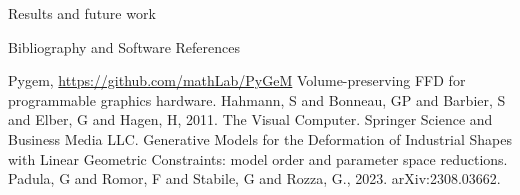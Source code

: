 \documentclass[b0paper,portrait]{baposter}
\begin{document}
\begin{poster}
\begin{posterbox}[name=results,below=vae,span=6,column=0]{Results and future work}
\end{posterbox}
\begin{posterbox}[name=bibliography,below=results,span=6,column=0]{Bibliography and Software References}
\begingroup
\renewcommand{\section}[2]{}%
\begin{thebibliography}{9}
 \setlength\itemsep{0.1em}
\small{
Pygem, \url{https://github.com/mathLab/PyGeM}
 Volume-preserving FFD for programmable graphics hardware.  Hahmann,  S and Bonneau, GP and Barbier,  S and Elber,  G and Hagen,  H, 2011. The Visual Computer.  Springer Science and Business Media LLC.
Generative Models for the Deformation of Industrial Shapes with Linear Geometric Constraints: model order and parameter space reductions.  Padula,  G and Romor,  F and Stabile,  G and Rozza,  G., 2023. arXiv:2308.03662.}
\end{thebibliography}
\endgroup
\end{posterbox}

\end{poster}
\end{document}
